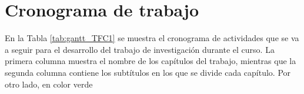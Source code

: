\section{Cronograma de trabajo}

En la Tabla \ref{tab:gantt_TFC1} se muestra el cronograma de actividades que se va a seguir para el desarrollo del trabajo de investigación durante el curso. La primera columna muestra el nombre de los capítulos del trabajo, mientras que la segunda columna contiene los subtítulos en los que se divide cada capítulo. Por otro lado, en color verde

